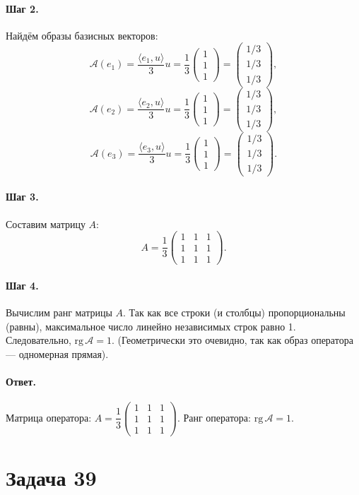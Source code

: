 \documentclass[12pt,a4paper]{article}
\theoremstyle{solution}
\newcommand{\task}[1]{\newpage\section*{Задача #1}}
\newcommand{\answer}{\paragraph{Ответ.}}
\newcommand{\step}[1]{\paragraph{Шаг #1.}}
\begin{document}
\step{2} Найдём образы базисных векторов:
\[
\mathcal{A}(e_1) = \frac{\langle e_1, u\rangle}{3} u = \frac{1}{3} \begin{pmatrix} 1 \\ 1 \\ 1 \end{pmatrix} = \begin{pmatrix} 1/3 \\ 1/3 \\ 1/3 \end{pmatrix},
\]
\[
\mathcal{A}(e_2) = \frac{\langle e_2, u\rangle}{3} u = \frac{1}{3} \begin{pmatrix} 1 \\ 1 \\ 1 \end{pmatrix} = \begin{pmatrix} 1/3 \\ 1/3 \\ 1/3 \end{pmatrix},
\]
\[
\mathcal{A}(e_3) = \frac{\langle e_3, u\rangle}{3} u = \frac{1}{3} \begin{pmatrix} 1 \\ 1 \\ 1 \end{pmatrix} = \begin{pmatrix} 1/3 \\ 1/3 \\ 1/3 \end{pmatrix}.
\]

\step{3} Составим матрицу $A$:
\[
A = \frac{1}{3} \begin{pmatrix} 1 & 1 & 1 \\ 1 & 1 & 1 \\ 1 & 1 & 1 \end{pmatrix}.
\]

\step{4} Вычислим ранг матрицы $A$. Так как все строки (и столбцы) пропорциональны (равны), максимальное число линейно независимых строк равно 1. Следовательно, $\mathrm{rg}\,\mathcal{A} = 1$. (Геометрически это очевидно, так как образ оператора — одномерная прямая).

\answer
Матрица оператора: $A = \dfrac{1}{3} \begin{pmatrix} 1 & 1 & 1 \\ 1 & 1 & 1 \\ 1 & 1 & 1 \end{pmatrix}$. Ранг оператора: $\mathrm{rg}\,\mathcal{A} = 1$.

\task{39}
\end{document}
